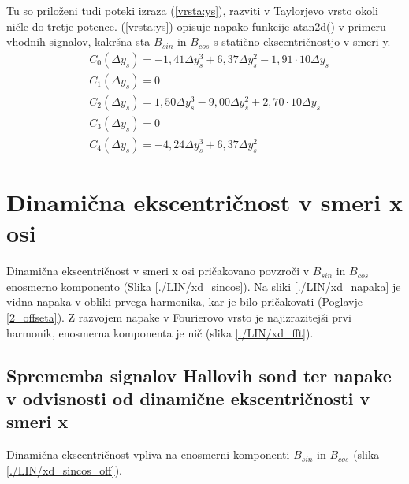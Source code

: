 Tu so priloženi tudi poteki izraza (\ref{vrsta:ys}), razviti v Taylorjevo vrsto okoli ničle do tretje potence. (\ref{vrsta:ys}) opisuje napako funkcije atan2d() v primeru vhodnih signalov, kakršna sta $B_{sin}$ in $B_{cos}$ s statično ekscentričnostjo v smeri y.
\begin{eqnarray}
&C_0(\Delta y_s) =-1,41\Delta y_s^{3}+6,37\Delta y_s^{2}-1,91\cdot 10\Delta y_s \\
&C_1(\Delta y_s) = 0\\
&C_2(\Delta y_s) =1,50\Delta y_s^{3}-9,00\Delta y_s^{2}+2,70\cdot 10\Delta y_s\\
&C_3(\Delta y_s) = 0\\
&C_4(\Delta y_s) =-4,24\Delta y_s^{3}+6,37\Delta y_s^{2}
\end{eqnarray}
\section{Dinamična ekscentričnost v smeri x osi}
Dinamična ekscentričnost v smeri x osi pričakovano povzroči v $B_{sin}$ in $B_{cos}$ enosmerno komponento (Slika \ref{./LIN/xd_sincos}).
 Na sliki \ref{./LIN/xd_napaka} je vidna napaka v obliki prvega harmonika, kar je bilo pričakovati (Poglavje \ref{2_offseta}).
Z razvojem napake v Fourierovo vrsto je najizrazitejši prvi harmonik, enosmerna komponenta je nič (slika \ref{./LIN/xd_fft}).

\newpage
\subsection{Sprememba signalov Hallovih sond ter napake v odvisnosti od dinamične ekscentričnosti v smeri x}
Dinamična ekscentričnost vpliva na enosmerni komponenti $B_{sin}$ in $B_{cos}$ (slika \ref{./LIN/xd_sincos_off}).

